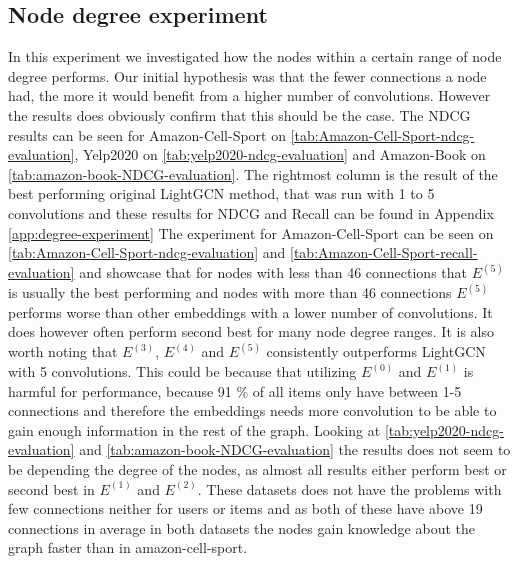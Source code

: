 \subsection{Node degree experiment}
In this experiment we investigated how the nodes within a certain range of node degree performs.
Our initial hypothesis was that the fewer connections a node had, the more it would benefit from a higher number of convolutions.
However the results does obviously confirm that this should be the case.
The NDCG results can be seen for Amazon-Cell-Sport on \autoref{tab:Amazon-Cell-Sport-ndcg-evaluation}, Yelp2020 on \autoref{tab:yelp2020-ndcg-evaluation} and Amazon-Book on \autoref{tab:amazon-book-NDCG-evaluation}.
The rightmost column is the result of the best performing original LightGCN method, that was run with 1 to 5 convolutions and these results for NDCG and Recall can be found in Appendix \ref{app:degree-experiment}
The experiment for Amazon-Cell-Sport can be seen on \autoref{tab:Amazon-Cell-Sport-ndcg-evaluation} and \autoref{tab:Amazon-Cell-Sport-recall-evaluation} and showcase that for nodes with less than 46 connections that $E^{(5)}$ is usually the best performing and nodes with more than 46 connections $E^{(5)}$ performs worse than other embeddings with a lower number of convolutions.
It does however often perform second best for many node degree ranges.
It is also worth noting that $E^{(3)}$, $E^{(4)}$ and $E^{(5)}$ consistently outperforms LightGCN with 5 convolutions.
This could be because that utilizing $E^{(0)}$ and $E^{(1)}$ is harmful for performance, because 91 \% of all items only have between 1-5 connections and therefore the embeddings needs more convolution to be able to gain enough information in the rest of the graph.
Looking at \autoref{tab:yelp2020-ndcg-evaluation} and \autoref{tab:amazon-book-NDCG-evaluation} the results does not seem to be depending the degree of the nodes, as almost all results either perform best or second best in $E^{(1)}$ and $E^{(2)}$.
These datasets does not have the problems with few connections neither for users or items and as both of these have above 19 connections in average in both datasets the nodes gain knowledge about the graph faster than in amazon-cell-sport.
